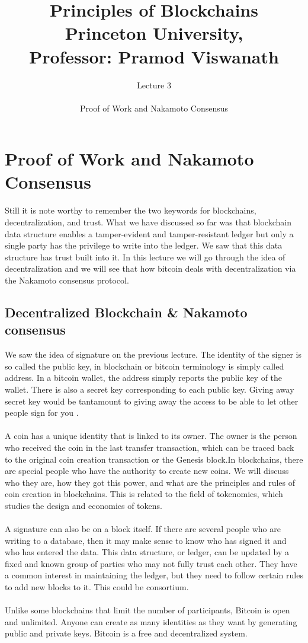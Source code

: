 \documentclass{report}
\title{\Huge{Principles of Blockchains \\ Princeton University,\\
		Professor: Pramod Viswanath}}
\author{\huge{Lecture 3} \\\\ Proof of Work and Nakamoto Consensus}
\begin{document}
\maketitle
\newpage%
\tableofcontents
\pagebreak

\chapter{Proof of Work and Nakamoto Consensus}
Still it is note worthy to remember the two keywords for blockchains, decentralization, and trust. What we have discussed so far was that blockchain data structure enables a tamper-evident and tamper-resistant ledger but only a single party has the privilege to write into the ledger. We saw that this data structure has trust built into it. In this lecture we will go through the idea of decentralization and we will see that how bitcoin deals with decentralization via the Nakamoto consensus protocol.

\section{Decentralized Blockchain \& Nakamoto consensus}
We saw the idea of signature on the previous lecture. The identity of the signer is so called the public key, in blockchain or bitcoin terminology is simply called address. In a bitcoin wallet, the address simply reports the public key of the wallet. There is also a secret key corresponding to each public key. Giving away secret key would be tantamount to giving away the access to be able to let other people sign for you .\\\\
A coin has a unique identity that is linked to its owner. The owner is the person who received the coin in the last transfer transaction, which can be traced back to the original coin creation transaction or the Genesis block.In blockchains, there are special people who have the authority to create new coins. We will discuss who they are, how they got this power, and what are the principles and rules of coin creation in blockchains. This is related to the field of tokenomics, which studies the design and economics of tokens.\\\\
A signature can also be on a block itself.  If there are several people who are writing to a database, then it may make sense to know who has signed it and who has entered the data. This data structure, or ledger, can be updated by a fixed and known group of parties who may not fully trust each other. They have a common interest in maintaining the ledger, but they need to follow certain rules to add new blocks to it. This could be consortium. \\\\
Unlike some blockchains that limit the number of participants, Bitcoin is open and unlimited. Anyone can create as many identities as they want by generating public and private keys. Bitcoin is a free and decentralized system.
\end{document}

